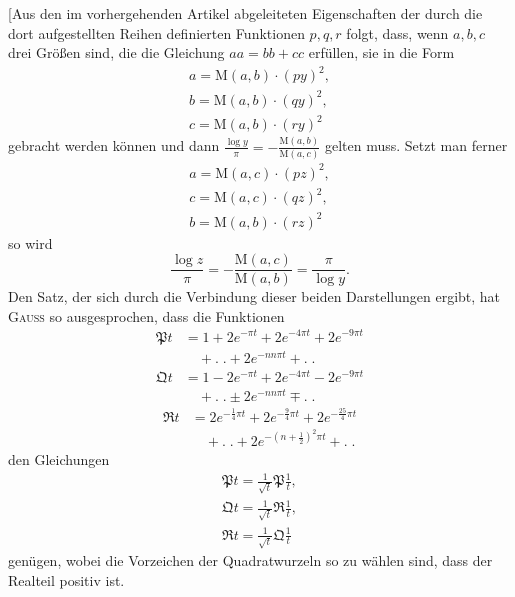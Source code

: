 \begingroup
\renewcommand{\arraystretch}{1.45}
[Aus den im vorhergehenden Artikel abgeleiteten Eigenschaften der durch die dort aufgestellten Reihen definierten Funktionen $p,q,r$ folgt, dass, wenn $a,b,c$ drei Größen sind, die die Gleichung $aa=bb+cc$ erfüllen, sie in die Form
\[
\begin{gathered}a=\mathrm M(a,b)\cdot(py)^2,\\[5pt] b=\mathrm M(a,b)\cdot(qy)^2,\\[5pt] c=\mathrm M(a,b)\cdot(ry)^2\end{gathered}
\]
gebracht werden können und dann $\frac{\log y}{\pi}=-\frac{\mathrm M(a,b)}{\mathrm M(a,c)}$ gelten muss. Setzt man ferner
\[
\begin{gathered}a=\mathrm M(a,c)\cdot(pz)^2,\\[5pt] c=\mathrm M(a,c)\cdot(qz)^2,\\[5pt] b=\mathrm M(a,b)\cdot(rz)^2\end{gathered}
\]
so wird
\[
\frac{\log z}{\pi}=-\frac{\mathrm M(a,c)}{\mathrm M(a,b)}=\frac{\pi}{\log y}.
\]
Den Satz, der sich durch die Verbindung dieser beiden Darstellungen ergibt, hat \textsc{Gauss} so ausgesprochen, dass die Funktionen
\[
\begin{aligned}\mathfrak P t&=1+2e^{-\pi t}+2e^{-4\pi t}+2e^{-9\pi t}\\&\quad+.\;.+2e^{-nn\pi t}+.\;.\end{aligned}
\]
\[
\begin{aligned}\mathfrak Q t&=1-2e^{-\pi t}+2e^{-4\pi t}-2e^{-9\pi t}\\&\quad+.\;.\pm2e^{-nn\pi t}\mp.\;.\end{aligned}
\]
\[
\begin{aligned}\mathfrak R t&=2e^{-\frac14\pi t}+2e^{-\frac94\pi t}+2e^{-\frac{25}4\pi t}\\&\quad+.\;.+2e^{-(n+\frac12)^2\pi t}+.\;.\end{aligned}
\]
den Gleichungen
\[
\begin{gathered}\mathfrak{P}t=\frac1{\surd t}\mathfrak{P}\frac1t,\\[5pt]
\mathfrak{Q}t=\frac1{\surd t}\mathfrak{R}\frac1t,\\[5pt]
\mathfrak{R}t=\frac1{\surd t}\mathfrak{Q}\frac1t\end{gathered}
\]
genügen, wobei die Vorzeichen der Quadratwurzeln so zu wählen sind, dass der Realteil positiv ist.

